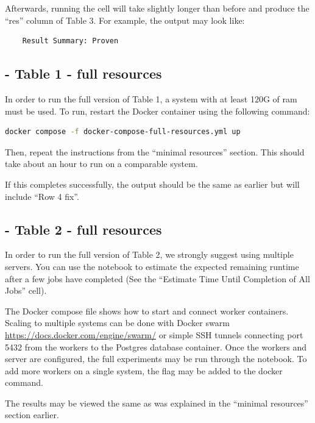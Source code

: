 \documentclass{acmart} %
\begin{document}
Afterwards, running the cell will take slightly longer than before  and produce the ``res'' column of Table 3.  For example, the output may look like:

\begin{lstlisting} 
    Result Summary: Proven
\end{lstlisting}


\subsection{ - Table 1 - full resources}

In order to run the full version of Table 1, a system with at least 120G of ram must be used. To run, restart the Docker container using the following command:

\begin{lstlisting}[language=bash]
  docker compose -f docker-compose-full-resources.yml up
\end{lstlisting}

Then, repeat the instructions from the ``minimal resources'' section.  This should take about an hour to run on a comparable system.

If this completes successfully, the output should be the same as earlier but will include ``Row 4 fix''.  

\subsection{ - Table 2 - full resources}

In order to run the full version of Table 2, we strongly suggest using multiple servers.
You can use the  notebook to estimate the expected remaining runtime after a few jobs have completed (See the ``Estimate Time Until Completion of All Jobs'' cell).

The Docker compose file  shows how to start and connect worker containers.  Scaling to multiple systems can be done with Docker swarm \url{https://docs.docker.com/engine/swarm/} or simple SSH tunnels connecting port 5432 from the workers to the Postgres database container. Once the workers and server are configured, the full experiments may be run through the  notebook.  To add more workers on a single system, the  flag may be added to the docker command.

The results may be viewed the same as was explained in the ``minimal resources'' section earlier.
\end{document}
